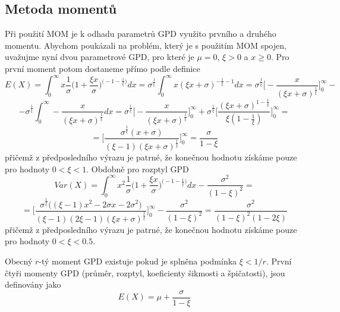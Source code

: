 \subsection{Metoda momentů}
Při použití MOM \cite{mom_orig} je k odhadu parametrů GPD využito prvního a druhého momentu. 
Abychom poukázali na problém, který je s použitím MOM spojen, uvažujme nyní dvou parametrové GPD, pro které je $\mu=0$, $\xi > 0$ a $x \geq 0$. 
Pro první moment potom dostaneme přímo podle definice
\begin{equation*}
E(X)=\int_{0}^{\infty}x\frac{1}{\sigma}\Bigg(1+\frac{\xi x}{\sigma}\Bigg)^{\Big(-1-\frac{1}{\xi}\Big)}dx=\sigma^{\frac{1}{\xi}}\int_{0}^{\infty}x(\xi x + \sigma)^{-\frac{1}{\xi}-1}dx=\sigma^{\frac{1}{\xi}}\Bigg[-\frac{x}{(\xi x + \sigma)^{\frac{1}{\xi}}}\Bigg]_0^{\infty}-
\end{equation*}
\begin{equation*}
-\sigma^{\frac{1}{\xi}}\int_{0}^{\infty}-\frac{x}{(\xi x + \sigma)^{\frac{1}{\xi}}} dx=\sigma^{\frac{1}{\xi}}\Bigg[-\frac{x}{(\xi x + \sigma)^{\frac{1}{\xi}}}\Bigg]_0^{\infty} + \sigma^{\frac{1}{\xi}}\Bigg[\frac{(\xi x + \sigma)^{1-\frac{1}{\xi}}}{\xi(1-\frac{1}{\xi})}\Bigg]_0^{\infty}=
\end{equation*}
\begin{equation}
=\Bigg[\frac{\sigma^{\frac{1}{\xi}}(x+\sigma)}{(\xi-1)(\xi x+\sigma)^{\frac{1}{\xi}}}\Bigg]_0^{\infty}=\frac{\sigma}{1-\xi}
\end{equation}
přičemž z předposledního výrazu je patrné, že konečnou hodnotu získáme pouze pro hodnoty $0 < \xi < 1$. Obdobně pro rozptyl GPD 
\begin{equation*}
Var(X)=\int_{0}^{\infty}x^2 \frac{1}{\sigma}\Bigg(1+\frac{\xi x}{\sigma}\Bigg)^{\big(-1-\frac{1}{\xi}\big)}dx-\frac{\sigma^2}{(1-\xi)^2}=
\end{equation*}
\begin{equation}
=\Bigg[\frac{\sigma^{\frac{1}{\xi}}\big((\xi-1)x^2-2\sigma x-2\sigma^2\big)}{(\xi-1)(2\xi-1)(\xi x+\sigma)^{\frac{1}{\xi}}}  \Bigg]_0^{\infty}-\frac{\sigma^2}{(1-\xi)^2}=\frac{\sigma^2}{(1-\xi)^2(1-2\xi)}
\end{equation}
přičemž z předposledního výrazu je patrné, že konečnou hodnotu získáme pouze pro hodnoty $0 < \xi < 0.5$.
\par
Obecný $r$-tý moment GPD existuje pokud je splněna podmínka $\xi < 1/r$.
První čtyři momenty GPD (průměr, rozptyl, koeficienty šikmosti a špičatosti), jsou definovány jako
\begin{equation}\label{eq:mom1}
E(X)=\mu+\frac{\sigma}{1-\xi}
\end{equation}
